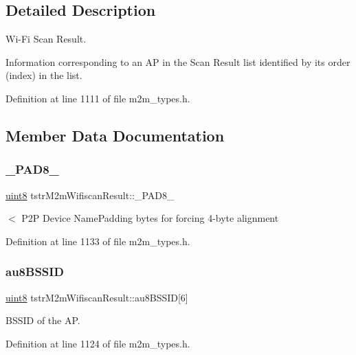 \subsection{Detailed Description}
Wi-\/\+Fi Scan Result. 

Information corresponding to an AP in the Scan Result list identified by its order (index) in the list. 

Definition at line 1111 of file m2m\+\_\+types.\+h.



\subsection{Member Data Documentation}
\mbox{\label{structtstrM2mWifiscanResult_ac65cfd7be1189c22e3dc92c3824ab552}} 
\subsubsection{\texorpdfstring{\+\_\+\+P\+A\+D8\+\_\+}{\_PAD8\_}}
{\footnotesize\ttfamily \hyperlink{group__DataT_ga4df709a77647e870bbf1d955b8edc9a6}{uint8} tstr\+M2m\+Wifiscan\+Result\+::\+\_\+\+P\+A\+D8\+\_\+}

$<$ P2P Device Name\+Padding bytes for forcing 4-\/byte alignment 

Definition at line 1133 of file m2m\+\_\+types.\+h.

\mbox{\label{structtstrM2mWifiscanResult_ae1d4c47f31a39e2423d5c7894022b95c}} 
\subsubsection{\texorpdfstring{au8\+B\+S\+S\+ID}{au8BSSID}}
{\footnotesize\ttfamily \hyperlink{group__DataT_ga4df709a77647e870bbf1d955b8edc9a6}{uint8} tstr\+M2m\+Wifiscan\+Result\+::au8\+B\+S\+S\+ID\mbox{[}6\mbox{]}}

B\+S\+S\+ID of the AP. 

Definition at line 1124 of file m2m\+\_\+types.\+h.


